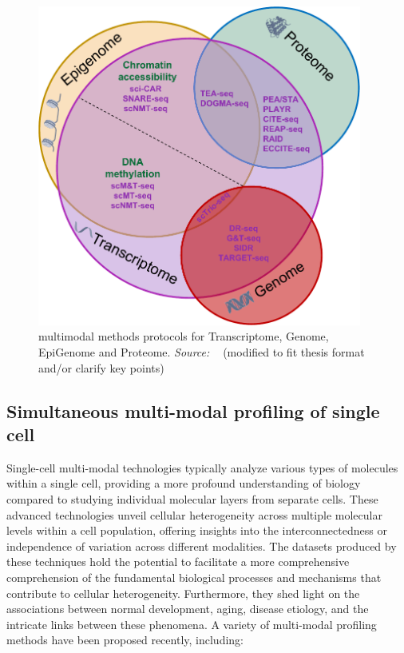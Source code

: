 \begin{figure}[!ht]
	\centering
	\includegraphics[width=0.95\textwidth]{multi-model-methods/fig}
	\vspace{0.1cm}
	\caption[multimodal methods protocols for Transcriptome, Genome, EpiGenome and Proteome]{multimodal methods protocols for Transcriptome, Genome, EpiGenome and Proteome. \emph{Source: ~\cite{lee2020single}} (modified to fit thesis format and/or clarify key points)}
	\label{fig:piechart-mulitmodal-methods}
\end{figure}



\subsection{Simultaneous multi-modal profiling of single cell}
\label{background:sec1:mulitmodal}
Single-cell multi-modal technologies typically analyze various types of molecules within a single cell, providing a more profound understanding of biology compared to studying individual molecular layers from separate cells. These advanced technologies unveil cellular heterogeneity across multiple molecular levels within a cell population, offering insights into the interconnectedness or independence of variation across different modalities. The datasets produced by these techniques hold the potential to facilitate a more comprehensive comprehension of the fundamental biological processes and mechanisms that contribute to cellular heterogeneity. Furthermore, they shed light on the associations between normal development, aging, disease etiology, and the intricate links between these phenomena. A variety of multi-modal profiling methods have been proposed recently, including:

